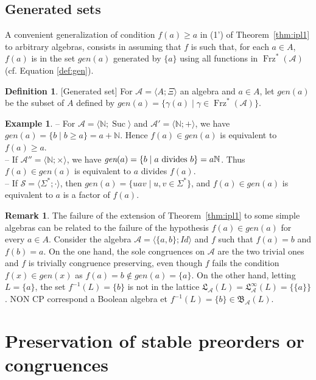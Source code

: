 \documentclass[11pt,a4paper]{article}
\theoremstyle{definition} %
\newtheorem{definition}[theorem]{Definition}
\newtheorem{remark}[theorem]{Remark}
\newtheorem{example}[theorem]{Example}
\newcommand\+[1]{\mathcal{#1}} %
\newcommand{\N}{{\mathbb N}}     %
\newcommand{\Bool}{{\mathfrak{B}}}   %
\newcommand{\Latt}{{\mathfrak{L}}}
\DeclareMathOperator{\freez}{Frz}%
\DeclareMathOperator{\suc}{Suc}%
\newcommand{\DUO}{{\freez}^*}
\newcommand{\gen}{\textit{gen}}
\newcommand{\pat}{\color{red}}
\begin{document}
\subsection{Generated sets}\label{ss generated sets}
A convenient generalization of  condition  $f(a)\geq a$ in (1') of Theorem~\ref{thm:ipl1} to arbitrary algebras, consists in assuming that $f$ is such that, for each $a\in A$, $f(a)$ is in the set $\gen(a)$ generated by $\{a\}$ using all functions in $  \DUO(\+A)$ (cf.\! Equation \ref{def:gen}).
%
\begin{definition} \label{def:gena} [Generated set] 
For $\+A=\langle A;\Xi\rangle$ an algebra and $a\in A$, let  $\gen(a)$ be the subset of $A$ defined by $\gen(a)=\{\gamma(a)\mid \gamma\in  \DUO(\+A) \}$. 
\end{definition}
%
\begin{example} -- For $\+A=\langle \N;\suc\rangle$ and $\+A'=\langle \N;+\rangle$, we have $\gen(a)=\{b\mid b\geq a\}=a+\N$. Hence  $f(a)\in gen(a)$ is equivalent to $f(a)\geq a$.
\\
--  If $\+A''=\langle \N;\times\rangle$,   we have $\gen(a)=\{b\mid a \hbox{ divides } b\}=a\N$.  Thus  $f(a)\in gen(a)$ is equivalent to $a$ divides $f(a)$.
\\
-- If $\+S=\langle\Sigma^*; \cdot \rangle$,  then $\gen(a)=\{u a v\mid u,v \in\Sigma^*\}$, and $f(a)\in gen(a)$ is equivalent to $a$ is a factor of $f(a)$.
\end{example}
%
\begin{remark}
 The failure of the extension of Theorem~\ref{thm:ipl1} to some simple algebras can be related  to the failure of the hypothesis $f(a)\in \gen(a)$ for every $a\in A$. 
Consider the algebra $\+A=\langle \{a,b\};Id\rangle$  and $f$ such that $f(a)=b$ and $f(b)=a$.  On the one hand, the sole congruences on $\+A$  are the two trivial ones and $f$ is trivially congruence preserving, even though $f$ fails the  condition $f(x)\in\gen(x)$ as $f(a)=b\notin\gen(a)=\{a\}$.
 On the other hand, letting $L=\{a\}$, the set $f^{-1}(L)=\{b\}$ is not in the lattice  $\Latt_{\+A}(L)=\Latt_{\+A}^\infty(L)= \{\{a\}\}$.
 {\pat NON CP correspond a Boolean algebra et  $f^{-1}(L)=\{b\}\in
 \Bool_{\+A}(L)$. }
  \end{remark}
\fi%

\section{ Preservation of stable preorders or congruences}\label{s:genResFin}%
\end{document}
